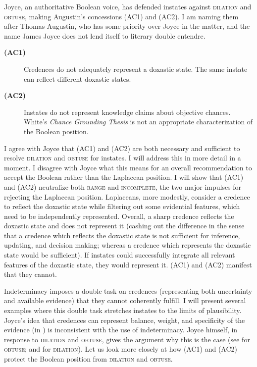 \documentclass[11pt]{article}
\begin{document}
Joyce, an authoritative Boolean voice, has defended instates against
\textsc{dilation} and \textsc{obtuse}, making Augustin's concessions
(AC1) and (AC2). I am naming them after Thomas Augustin, who has some
priority over Joyce in the matter, and the name James Joyce does not
lend itself to literary double entendre.

\begin{description}
\item[{\bf (AC1)}] Credences do not adequately represent a doxastic
  state. The same instate can reflect different doxastic states.
\item[{\bf (AC2)}] Instates do not represent knowledge claims about
  objective chances. White's \emph{Chance Grounding Thesis} is not an
  appropriate characterization of the Boolean position.
\end{description}

I agree with Joyce that (AC1) and (AC2) are both necessary and
sufficient to resolve \textsc{dilation} and \textsc{obtuse} for
instates. I will address this in more detail in a moment. I disagree
with Joyce what this means for an overall recommendation to accept the
Boolean rather than the Laplacean position. I will show that (AC1) and
(AC2) neutralize both \textsc{range} and \textsc{incomplete}, the two
major impulses for rejecting the Laplacean position. Laplaceans, more
modestly, consider a credence to reflect the doxastic state while
filtering out some evidential features, which need to be independently
represented. Overall, a sharp credence reflects the doxastic state and
does not represent it (cashing out the difference in the sense that a
credence which reflects the doxastic state is not sufficient for
inference, updating, and decision making; whereas a credence which
represents the doxastic state would be sufficient). If instates could
successfully integrate all relevant features of the doxastic state,
they would represent it. (AC1) and (AC2) manifest that they
cannot.

Indeterminacy imposes a double task on credences (representing both
uncertainty and available evidence) that they cannot coherently
fulfill. I will present several examples where this double task
stretches instates to the limits of plausibility. Joyce's idea that
credences can represent balance, weight, and specificity of the
evidence (in ) is inconsistent with the use of
indeterminacy. Joyce himself, in response to \textsc{dilation} and
\textsc{obtuse}, gives the argument why this is the case (see
 for \textsc{obtuse}; and
 for \textsc{dilation}). Let us look
more closely at how (AC1) and (AC2) protect the Boolean position from
\textsc{dilation} and \textsc{obtuse}.
\end{document}
